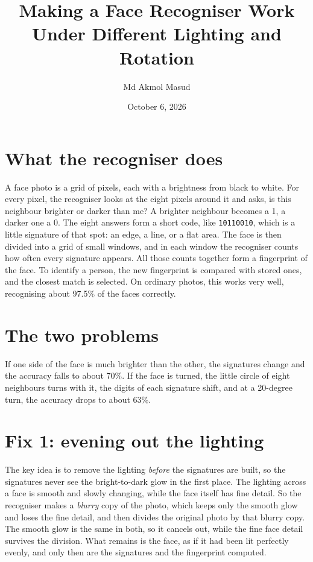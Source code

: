 \documentclass[11pt]{article}
\title{Making a Face Recogniser Work\\ Under Different Lighting and Rotation}
\author{Md Akmol Masud}
\date{October 6, 2026}
\begin{document}
\maketitle

\section{What the recogniser does}

A face photo is a grid of pixels, each with a brightness from black to white. For every pixel, the recogniser looks at the eight pixels around it and asks, is this neighbour brighter or darker than me? A brighter neighbour becomes a 1, a darker one a 0. The eight answers form a short code, like \texttt{10110010}, which is a little signature of that spot: an edge, a line, or a flat area. The face is then divided into a grid of small windows, and in each window the recogniser counts how often every signature appears. All those counts together form a fingerprint of the face. To identify a person, the new fingerprint is compared with stored ones, and the closest match is selected. On ordinary photos, this works very well, recognising about 97.5\% of the faces correctly.

\section{The two problems}

If one side of the face is much brighter than the other, the signatures change and the accuracy falls to about 70\%. If the face is turned, the little circle of eight neighbours turns with it, the digits of each signature shift, and at a 20-degree turn, the accuracy drops to about 63\%.

\section{Fix 1: evening out the lighting}

The key idea is to remove the lighting \emph{before} the signatures are built, so the signatures never see the bright-to-dark glow in the first place. The lighting across a face is smooth and slowly changing, while the face itself has fine detail. So the recogniser makes a \emph{blurry} copy of the photo, which keeps only the smooth glow and loses the fine detail, and then divides the original photo by that blurry copy. The smooth glow is the same in both, so it cancels out, while the fine face detail survives the division. What remains is the face, as if it had been lit perfectly evenly, and only then are the signatures and the fingerprint computed.
\end{document}
